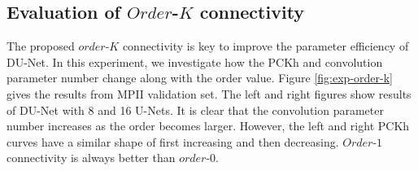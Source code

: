 
\subsection{Evaluation of $Order$-$K$ connectivity}
The proposed $order$-$K$ connectivity is key to improve the parameter efficiency of DU-Net. In this experiment, we investigate how the PCKh and convolution parameter number change along with the order value. Figure \ref{fig:exp-order-k} gives the results from MPII validation set. The left and right figures show results of DU-Net with 8 and 16 U-Nets. It is clear that the convolution parameter number increases as the order becomes larger. However, the left and right PCKh curves have a similar shape of first increasing and then decreasing. $Order$-$1$ connectivity is always better than $order$-$0$. 

